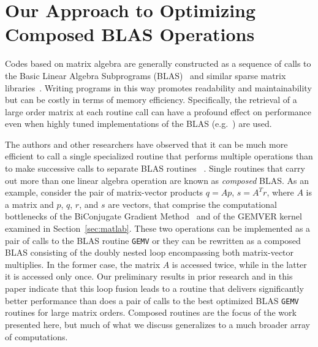 \documentclass[11pt]{article}
\begin{document}
\section{Our Approach to Optimizing Composed BLAS Operations}
\label{sec:approach}


Codes based on matrix algebra are generally constructed as a sequence of calls to the Basic Linear Algebra Subprograms (BLAS)~\cite{Dongarra:1988uq,Lawson:1979kx,Dongarra:1990fk} and similar sparse matrix libraries~\cite{Saad:fr,George:1981uq}. Writing programs in this way promotes readability and maintainability but can be costly in terms of memory efficiency. Specifically, the retrieval of a large order matrix at each routine call can have a profound effect on performance even when highly tuned implementations of the BLAS (e.g.~\cite{Bilmes:1997ye,Whaley:1998fk,IntelMath:oq,ESSL:kl,Goto:2006fk}) are used.

The authors and other researchers have observed that it can be much more efficient to call a single specialized routine that performs multiple operations than to make successive calls to separate BLAS routines ~\cite{Ashby:uq,Blackford:2002vn,baker03blgmres,baker03lgmres,Dennis:2005tg,Howell:2008,gropp01,Vuduc:2003kl}.  Single routines that carry out more than one linear algebra operation are known as \emph{composed} BLAS. As an example, consider the pair of matrix-vector products $q  = Ap$, $s  = A^Tr$, where $A$ is a matrix and $p$, $q$, $r$, and $s$ are vectors, that comprise the computational
bottlenecks of the BiConjugate Gradient Method~\cite{Barrett:1994kx,Saad:2003fk}  and of the GEMVER kernel examined in Section~\ref{sec:matlab}.   These two operations can be implemented as a pair of calls to the BLAS routine {\tt GEMV} or they can be rewritten as a composed BLAS consisting of the doubly nested loop encompassing both matrix-vector multiplies. In the former case, the matrix $A$ is accessed twice, while in the latter it is accessed only once. Our preliminary results in prior research and in this paper indicate that this loop fusion leads to a routine that delivers significantly better performance than does a pair of calls to the best optimized BLAS {\tt GEMV} routines for large matrix orders.
Composed routines are the focus of the work presented here, but much of what we discuss generalizes to a much broader array of computations.  
\end{document}
